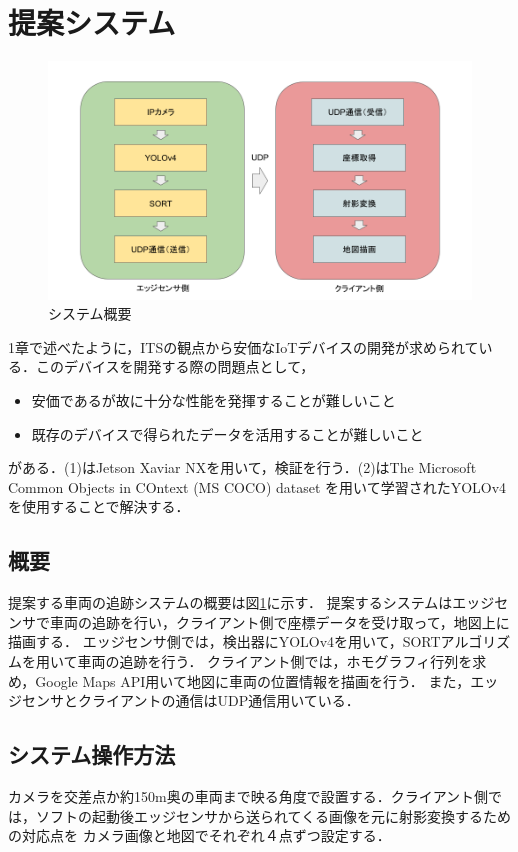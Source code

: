 \documentclass[technicalreport]{ieicej}
\begin{document}
\section{提案システム}
\begin{figure}[t]
  \includegraphics*[bb=0 0 950 500, width=1\linewidth]{./images/system.png}
  \caption{システム概要}
  \label{tab:system}
  \end{figure}
1章で述べたように，ITSの観点から安価なIoTデバイスの開発が求められている．このデバイスを開発する際の問題点として，
\begin{itemize}
  \item[(1)]安価であるが故に十分な性能を発揮することが難しいこと
  \item[(2)]既存のデバイスで得られたデータを活用することが難しいこと
\end{itemize}
がある．(1)はJetson Xaviar NXを用いて，検証を行う．(2)はThe Microsoft Common Objects in COntext (MS COCO) dataset\cite{lin2014microsoft}
を用いて学習されたYOLOv4を使用することで解決する．

\subsection{概要}
提案する車両の追跡システムの概要は図\ref{tab:system}に示す．
提案するシステムはエッジセンサで車両の追跡を行い，クライアント側で座標データを受け取って，地図上に描画する．
エッジセンサ側では，検出器にYOLOv4を用いて，SORTアルゴリズム\cite{wojke2017simple}を用いて車両の追跡を行う．
クライアント側では，ホモグラフィ行列を求め，Google Maps API\cite{googlemap}用いて地図に車両の位置情報を描画を行う．
また，エッジセンサとクライアントの通信はUDP通信用いている．

\subsection{システム操作方法}
カメラを交差点か約150m奥の車両まで映る角度で設置する．クライアント側では，ソフトの起動後エッジセンサから送られてくる画像を元に射影変換するための対応点を
カメラ画像と地図でそれぞれ４点ずつ設定する．
\end{document}
